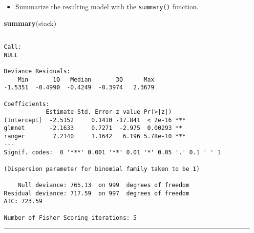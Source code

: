 \documentclass[]{book}
\newenvironment{Shaded}{\begin{snugshade}}{\end{snugshade}}
\newcommand{\KeywordTok}[1]{\textcolor[rgb]{0.13,0.29,0.53}{\textbf{#1}}}
\newcommand{\NormalTok}[1]{#1}
\providecommand{\tightlist}{%
  \setlength{\itemsep}{0pt}\setlength{\parskip}{0pt}}
\begin{document}
\begin{itemize}
\tightlist
\item
  Summarize the resulting model with the \texttt{summary()} function.
\end{itemize}

\begin{Shaded}
\begin{Highlighting}[]
\KeywordTok{summary}\NormalTok{(stack)}
\end{Highlighting}
\end{Shaded}

\begin{verbatim}

Call:
NULL

Deviance Residuals: 
    Min       1Q   Median       3Q      Max  
-1.5351  -0.4990  -0.4249  -0.3974   2.3679  

Coefficients:
            Estimate Std. Error z value Pr(>|z|)    
(Intercept)  -2.5152     0.1410 -17.841  < 2e-16 ***
glmnet       -2.1633     0.7271  -2.975  0.00293 ** 
ranger        7.2140     1.1642   6.196 5.78e-10 ***
---
Signif. codes:  0 '***' 0.001 '**' 0.01 '*' 0.05 '.' 0.1 ' ' 1

(Dispersion parameter for binomial family taken to be 1)

    Null deviance: 765.13  on 999  degrees of freedom
Residual deviance: 717.59  on 997  degrees of freedom
AIC: 723.59

Number of Fisher Scoring iterations: 5
\end{verbatim}

\begin{center}\rule{0.5\linewidth}{\linethickness}\end{center}


\end{document}
